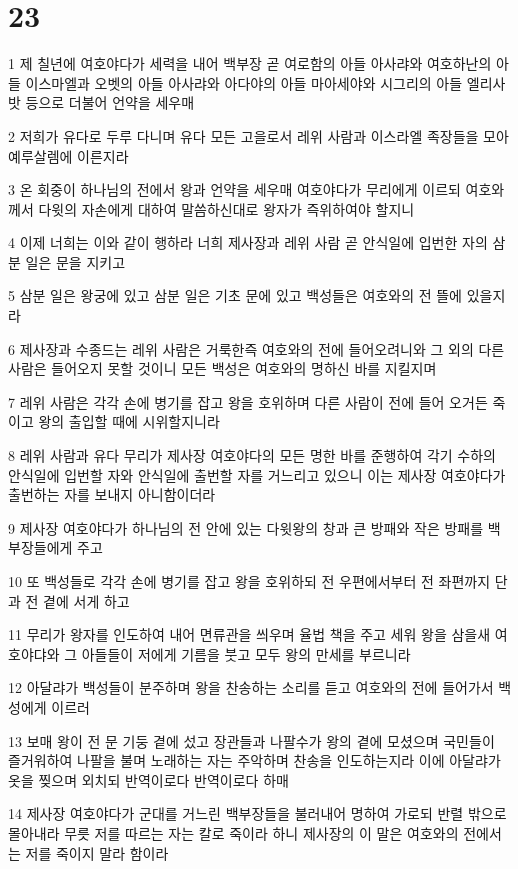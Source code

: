 \chapter{23}

\par 1 제 칠년에 여호야다가 세력을 내어 백부장 곧 여로함의 아들 아사랴와 여호하난의 아들 이스마엘과 오벳의 아들 아사랴와 아다야의 아들 마아세야와 시그리의 아들 엘리사밧 등으로 더불어 언약을 세우매
\par 2 저희가 유다로 두루 다니며 유다 모든 고을로서 레위 사람과 이스라엘 족장들을 모아 예루살렘에 이른지라
\par 3 온 회중이 하나님의 전에서 왕과 언약을 세우매 여호야다가 무리에게 이르되 여호와께서 다윗의 자손에게 대하여 말씀하신대로 왕자가 즉위하여야 할지니
\par 4 이제 너희는 이와 같이 행하라 너희 제사장과 레위 사람 곧 안식일에 입번한 자의 삼분 일은 문을 지키고
\par 5 삼분 일은 왕궁에 있고 삼분 일은 기초 문에 있고 백성들은 여호와의 전 뜰에 있을지라
\par 6 제사장과 수종드는 레위 사람은 거룩한즉 여호와의 전에 들어오려니와 그 외의 다른 사람은 들어오지 못할 것이니 모든 백성은 여호와의 명하신 바를 지킬지며
\par 7 레위 사람은 각각 손에 병기를 잡고 왕을 호위하며 다른 사람이 전에 들어 오거든 죽이고 왕의 출입할 때에 시위할지니라
\par 8 레위 사람과 유다 무리가 제사장 여호야다의 모든 명한 바를 준행하여 각기 수하의 안식일에 입번할 자와 안식일에 출번할 자를 거느리고 있으니 이는 제사장 여호야다가 출번하는 자를 보내지 아니함이더라
\par 9 제사장 여호야다가 하나님의 전 안에 있는 다윗왕의 창과 큰 방패와 작은 방패를 백부장들에게 주고
\par 10 또 백성들로 각각 손에 병기를 잡고 왕을 호위하되 전 우편에서부터 전 좌편까지 단과 전 곁에 서게 하고
\par 11 무리가 왕자를 인도하여 내어 면류관을 씌우며 율법 책을 주고 세워 왕을 삼을새 여호야댜와 그 아들들이 저에게 기름을 붓고 모두 왕의 만세를 부르니라
\par 12 아달랴가 백성들이 분주하며 왕을 찬송하는 소리를 듣고 여호와의 전에 들어가서 백성에게 이르러
\par 13 보매 왕이 전 문 기둥 곁에 섰고 장관들과 나팔수가 왕의 곁에 모셨으며 국민들이 즐거워하여 나팔을 불며 노래하는 자는 주악하며 찬송을 인도하는지라 이에 아달랴가 옷을 찢으며 외치되 반역이로다 반역이로다 하매
\par 14 제사장 여호야다가 군대를 거느린 백부장들을 불러내어 명하여 가로되 반렬 밖으로 몰아내라 무릇 저를 따르는 자는 칼로 죽이라 하니 제사장의 이 말은 여호와의 전에서는 저를 죽이지 말라 함이라

